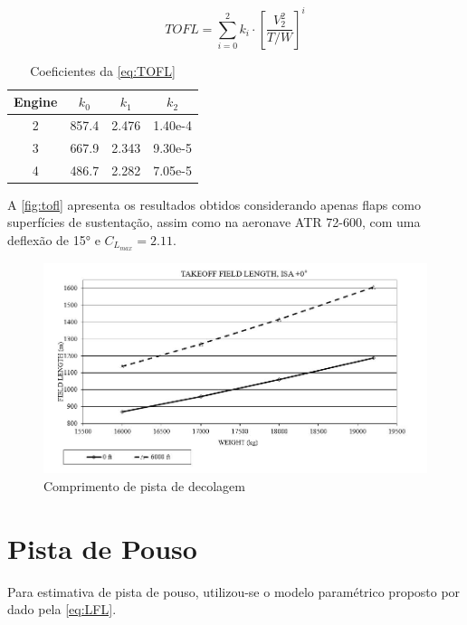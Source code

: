 \begin{equation}
\label{eq:TOFL}
    TOFL = \sum_{i=0}^{2} k_i \cdot \left[ \frac{V_{2}^2}{T/W} \right]^i
\end{equation}


\begin{table}[H]
    \centering
    \begin{tabular}{c|c c c}
        Engine & $k_0$ & $k_1$ & $k_2$  \\ \toprule
         2 & 857.4 & 2.476 & 1.40e-4 \\
         3 & 667.9 & 2.343 & 9.30e-5 \\
         4 & 486.7 & 2.282 & 7.05e-5 \\ \bottomrule
    \end{tabular}
    \caption{Coeficientes da \autoref{eq:TOFL}}
    \label{tab:my_label}
\end{table}

A \autoref{fig:tofl} apresenta os resultados obtidos considerando apenas flaps como superfícies de sustentação, assim como na aeronave ATR 72-600, com uma deflexão de 15° e $C_{L_{max}} = 2.11$.

\begin{figure}[H]
\centering
\includegraphics[width=1.\textwidth]{images/parte4/TOFL.JPG}
\caption{Comprimento de pista de decolagem}
\label{fig:tofl}
\end{figure}

\clearpage

\section{Pista de Pouso}

Para estimativa de pista de pouso, utilizou-se o modelo paramétrico proposto por \cite{lukaczyk2015suave} dado pela \autoref{eq:LFL}.


